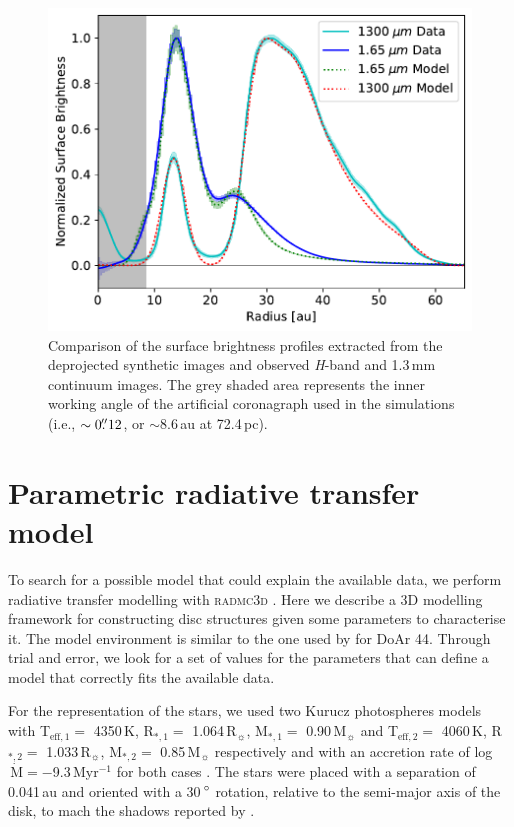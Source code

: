 \documentclass[letters, usenatbib]{mnras}
\begin{document}
\begin{figure}
	\includegraphics[width=\columnwidth]{comp_fig_all_profiles_au.pdf}
    \caption{Comparison of the surface brightness profiles extracted from the deprojected synthetic images and observed \textit{H}-band and 1.3\,mm continuum images. The grey shaded area represents the inner working angle of the artificial coronagraph used in the simulations (i.e., $\sim0\hbox{$.\!\!^{\prime\prime}$} 12$, or $\sim$8.6\,au at 72.4\,pc).}
    \label{fig:radprofiles}
\end{figure}

\section{Parametric radiative transfer model} \label{sec:model}

To search for a possible model that could explain the available data, we perform radiative transfer modelling with \textsc{radmc3d} \citep{Dullemond_2012}. Here we describe a 3D modelling framework for constructing disc structures given some parameters to characterise it. The model environment is similar to the one used by \citet{2018MNRAS.477.5104C} for DoAr 44. Through trial and error, we look for a set of values for the parameters that can define a model that correctly fits the available data.

For the representation of the stars, we used two Kurucz photospheres models \citep{1979ApJS...40....1K, 1997A&A...318..841C} with T$_{\mathrm{eff},1} =$ 4350\,K, R$_{*,1} =$ 1.064\,R$_{\sun}$, M$_{*,1} =$ 0.90\,M$_{\sun}$ and T$_{\mathrm{eff},2} =$ 4060\,K, R$_{*,2} =$ 1.033\,R$_{\sun}$, M$_{*,2} =$ 0.85\,M$_{\sun}$ respectively and with an accretion rate of log$\,\dot{\mathrm{M}} = -$9.3\,Myr$^{-1}$ for both cases \citep{10.1111/j.1365-2966.2011.19366.x}. The stars were placed with a separation of 0.041\,au and oriented with a 30\,$\hbox{$^\circ$}$ rotation, relative to the semi-major axis of the disk, to mach the shadows reported by \citet{dOrazi}.
\end{document}
